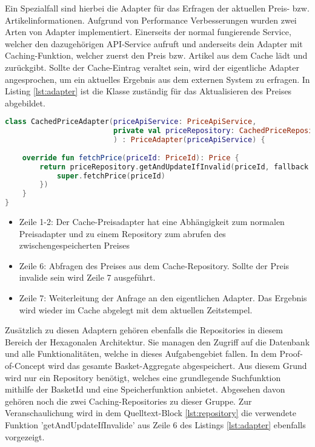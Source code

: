 Ein Spezialfall sind hierbei die Adapter für das Erfragen der aktuellen Preis- bzw. Artikelinformationen. Aufgrund von Performance Verbesserungen wurden zwei Arten von Adapter implementiert. Einerseits der normal fungierende Service, welcher den dazugehörigen API-Service aufruft und anderseits dein Adapter mit Caching-Funktion, welcher zuerst den Preis bzw. Artikel aus dem Cache lädt und zurückgibt. Sollte der Cache-Eintrag veraltet sein, wird der eigentliche Adapter angesprochen, um ein aktuelles Ergebnis aus dem externen System zu erfragen. In Listing \ref{lst:adapter} ist die Klasse zuständig für das Aktualisieren des Preises abgebildet.

\begin{minipage}{\linewidth} %
	\begin{lstlisting}[caption={Preisadapter mit Caching-Funktion}, label={lst:adapter}, language=Kotlin]
class CachedPriceAdapter(priceApiService: PriceApiService,
						 private val priceRepository: CachedPriceRepository
						 ) : PriceAdapter(priceApiService) {
	
	override fun fetchPrice(priceId: PriceId): Price {
		return priceRepository.getAndUpdateIfInvalid(priceId, fallback = {
			super.fetchPrice(priceId)
		})
	}
}
	\end{lstlisting}
\end{minipage}

\begin{itemize}[noitemsep,nolistsep]
	\item Zeile 1-2: Der Cache-Preisadapter hat eine Abhängigkeit zum normalen Preisadapter und zu einem Repository zum abrufen des zwischengespeicherten Preises
	\item Zeile 6: Abfragen des Preises aus dem Cache-Repository. Sollte der Preis invalide sein wird Zeile 7 ausgeführt.
	\item Zeile 7: Weiterleitung der Anfrage an den eigentlichen Adapter. Das Ergebnis wird wieder im Cache abgelegt mit dem aktuellen Zeitstempel.
\end{itemize}

Zusätzlich zu diesen Adaptern gehören ebenfalls die Repositories in diesem Bereich der Hexagonalen Architektur. Sie managen den Zugriff auf die Datenbank und alle Funktionalitäten, welche in dieses Aufgabengebiet fallen. In dem Proof-of-Concept wird das gesamte Basket-Aggregate abgespeichert. Aus diesem Grund wird nur ein Repository benötigt, welches eine grundlegende Suchfunktion mithilfe der BasketId und eine Speicherfunktion anbietet. Abgesehen davon gehören noch die zwei Caching-Repositories zu dieser Gruppe. Zur Veranschaulichung wird in dem Quelltext-Block \ref{lst:repository} die verwendete Funktion 'getAndUpdateIfInvalide' aus Zeile 6 des Listings \ref{lst:adapter} ebenfalls vorgezeigt.

